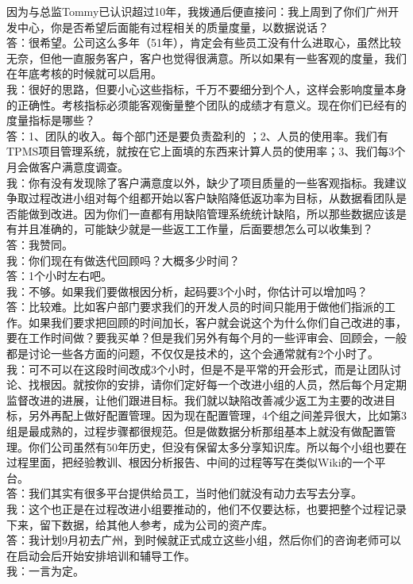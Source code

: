 因为与总监Tommy已认识超过10年，我拨通后便直接问：我上周到了你们广州开发中心，你是否希望后面能有过程相关的质量度量，以数据说话？\\
答：很希望。公司这么多年（51年），肯定会有些员工没有什么进取心，虽然比较无奈，但他一直服务客户，客户也觉得很满意。所以如果有一些客观的度量，我们在年底考核的时候就可以启用。\\
我：很好的思路，但要小心这些指标，千万不要细分到个人，这样会影响度量本身的正确性。考核指标必须能客观衡量整个团队的成绩才有意义。现在你们已经有的度量指标是哪些？\\
答：1、团队的收入。每个部门还是要负责盈利的
；2、人员的使用率。我们有TPMS项目管理系统，就按在它上面填的东西来计算人员的使用率；3、我们每3个月会做客户满意度调查。\\
我：你有没有发现除了客户满意度以外，缺少了项目质量的一些客观指标。我建议争取过程改进小组对每个组都开始以客户缺陷降低返功率为目标，从数据看团队是否能做到改进。因为你们一直都有用缺陷管理系统统计缺陷，所以那些数据应该是有并且准确的，可能缺少就是一些返工工作量，后面要想怎么可以收集到？\\
答：我赞同。\\
我：你们现在有做迭代回顾吗？大概多少时间？\\
答：1个小时左右吧。\\
我：不够。如果我们要做根因分析，起码要3个小时，你估计可以增加吗？\\
答：比较难。比如客户部门要求我们的开发人员的时间只能用于做他们指派的工作。如果我们要求把回顾的时间加长，客户就会说这个为什么你们自己改进的事，要在工作时间做？要我买单？但是我们另外有每个月的一些评审会、回顾会，一般都是讨论一些各方面的问题，不仅仅是技术的，这个会通常就有2个小时了。\\
我：可不可以在这段时间改成3个小时，但是不是平常的开会形式，而是让团队讨论、找根因。就按你的安排，请你们定好每一个改进小组的人员，然后每个月定期监督改进的进展，让他们跟进目标。我们就以缺陷改善减少返工为主要的改进目标，另外再配上做好配置管理。因为现在配置管理，4个组之间差异很大，比如第3组是最成熟的，过程步骤都很规范。但是做数据分析那组基本上就没有做配置管理。你们公司虽然有50年历史，但没有保留太多分享知识库。所以每个小组也要在过程里面，把经验教训、根因分析报告、中间的过程等写在类似Wiki的一个平台。\\
答：我们其实有很多平台提供给员工，当时他们就没有动力去写去分享。\\
我：这个也正是在过程改进小组要推动的，他们不仅要达标，也要把整个过程记录下来，留下数据，给其他人参考，成为公司的资产库。\\
答：我计划9月初去广州，到时候就正式成立这些小组，然后你们的咨询老师可以在启动会后开始安排培训和辅导工作。\\
我：一言为定。

